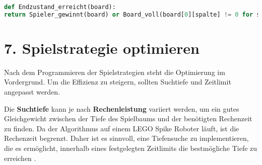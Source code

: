 \begin{lstlisting}[language=Python, caption=Erkennung des Endzustands]
def Endzustand_erreicht(board):
return Spieler_gewinnt(board) or Board_voll(board[0][spalte] != 0 for spalte in range(7))
\end{lstlisting}

\section*{7. Spielstrategie optimieren}

Nach dem Programmieren der Spielstrategien steht die Optimierung im Vordergrund. Um die Effizienz zu steigern, sollten Suchtiefe und Zeitlimit angepasst werden.

Die \textbf{Suchtiefe} kann je nach \textbf{Rechenleistung} variiert werden, um ein gutes Gleichgewicht zwischen der Tiefe des Spielbaums und der benötigten Rechenzeit zu finden. Da der Algorithmus auf einem LEGO Spike Roboter läuft, ist die Rechenzeit begrenzt. Daher ist es sinnvoll, eine Tiefensuche zu implementieren, die es ermöglicht, innerhalb eines festgelegten Zeitlimits die bestmögliche Tiefe zu erreichen \autocites{holler_einfuhrung_2019}. 







